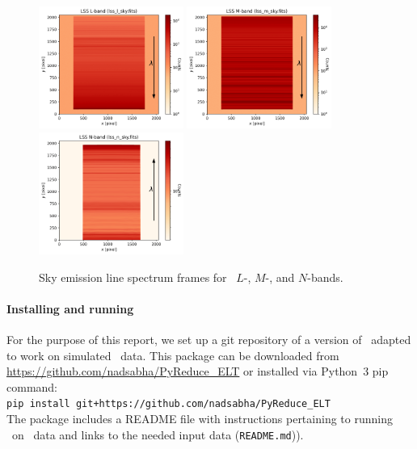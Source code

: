 \begin{figure}[!h]
\centering
  \includegraphics[height=4cm,keepaspectratio]{figures/LSS_CrtAlg_files/lss_l_sky.fits.png}
  \includegraphics[height=4cm,keepaspectratio]{figures/LSS_CrtAlg_files/lss_m_sky.fits.png}
  \includegraphics[height=4cm,keepaspectratio]{figures/LSS_CrtAlg_files/lss_n_sky.fits.png}
  \caption{Sky emission line spectrum frames for \lss~$L$-, $M$-, and $N$-bands.} 
  \label{fig:sky}
\end{figure}



\paragraph{Installing and running \pyred}\label{sec:pryred_install}

For the purpose of this report, we set up a git repository of a version of \pyred~adapted to work on simulated \met~data. This package can be downloaded from \url{https://github.com/nadsabha/PyReduce_ELT} or installed via Python~3 pip command: \\
\texttt{pip install git+https://github.com/nadsabha/PyReduce\_ELT} \\
The package includes a README file with instructions pertaining to running \pyred~on \elt~data and links to the needed input data (\texttt{README.md})).


